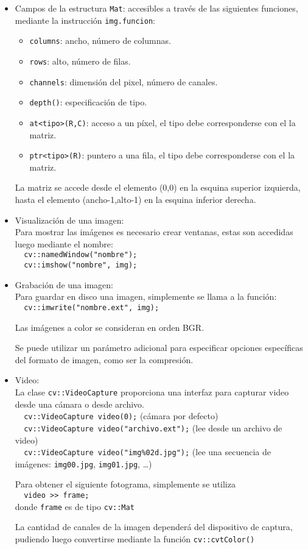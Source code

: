 \documentclass[oneside,a4paper]{book}
\newcommand{\tc}[1]{\texttt{#1}}
\begin{document}
\begin{itemize}
	\item Campos de la estructura \tc{Mat}: accesibles a través de las siguientes funciones, mediante la instrucción \tc{img.funcion}:
		\begin{itemize}
			\item \tc{columns}: ancho, número de columnas.
			\item \tc{rows}: alto, número de filas.
			\item \tc{channels}: dimensión del pixel, número de canales.
			\item \tc{depth()}: especificación de tipo.
			\item \tc{at<tipo>(R,C)}: acceso a un píxel, el tipo debe corresponderse con el la matriz.
			\item \tc{ptr<tipo>(R)}: puntero a una fila, el tipo debe corresponderse con el la matriz.
		\end{itemize}
		La matriz se accede desde el elemento (0,0) en la esquina superior izquierda, hasta el elemento (ancho-1,alto-1) en la esquina inferior derecha.

	\item Visualización de una imagen:\\
		Para mostrar las imágenes es necesario crear ventanas, estas son accedidas luego mediante el nombre:\\
		\verb|  cv::namedWindow("nombre");|\\
		\verb|  cv::imshow("nombre", img);|

	\item Grabación de una imagen:\\
		Para guardar en disco una imagen, simplemente se llama a la función:\\
		\verb|  cv::imwrite("nombre.ext", img);|

		Las imágenes a color se consideran en orden BGR.

		Se puede utilizar un parámetro adicional para especificar opciones específicas del formato de imagen, como ser la compresión.

	\item Video:\\
		La clase \tc{cv::VideoCapture} proporciona una interfaz para capturar video desde una cámara o desde archivo.\\
		\verb|  cv::VideoCapture video(0);| (cámara por defecto)\\
		\verb|  cv::VideoCapture video("archivo.ext");| (lee desde un archivo de video)\\
		\verb|  cv::VideoCapture video("img%02d.jpg");| (lee una secuencia de imágenes: \tc{img00.jpg}, \tc{img01.jpg}, \ldots)

		Para obtener el siguiente fotograma, simplemente se utiliza\\
		\verb|  video >> frame;|\\
		donde \tc{frame} es de tipo \tc{cv::Mat}

		La cantidad de canales de la imagen dependerá del dispositivo de captura, pudiendo luego convertirse mediante la función \tc{cv::cvtColor()}
\end{itemize}
\end{document}
